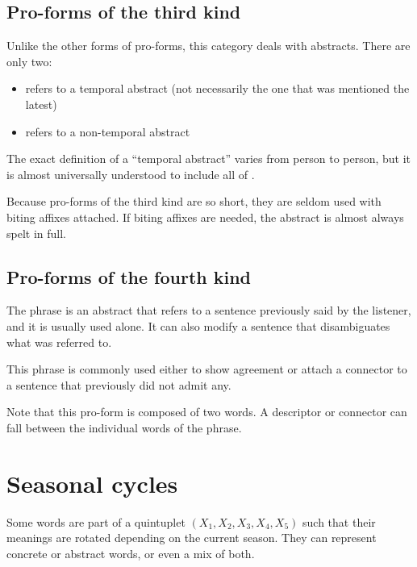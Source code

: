 \documentclass{book}
\begin{document}
\subsection{Pro-forms of the third kind}

Unlike the other forms of pro-forms, this category deals with abstracts. There are only two:

\begin{itemize}
  \item {} refers to a temporal abstract (not necessarily the one that was mentioned the latest)
  \item {} refers to a non-temporal abstract
\end{itemize}

The exact definition of a ``temporal abstract'' varies from person to person, but it is almost universally understood to include all of .

Because pro-forms of the third kind are so short, they are seldom used with biting affixes attached. If biting affixes are needed, the abstract is almost always spelt in full.

\subsection{Pro-forms of the fourth kind}

The phrase  is an abstract that refers to a sentence previously said by the listener, and it is usually used alone. It can also modify a sentence that disambiguates what was referred to.

This phrase is commonly used either to show agreement or attach a connector to a sentence that previously did not admit any.

Note that this pro-form is composed of two words. A descriptor or connector can fall between the individual words of the phrase.

\section{Seasonal cycles}

Some words are part of a quintuplet $(X_1, X_2, X_3, X_4, X_5)$ such that their meanings are rotated depending on the current season. They can represent concrete or abstract words, or even a mix of both.
\end{document}
